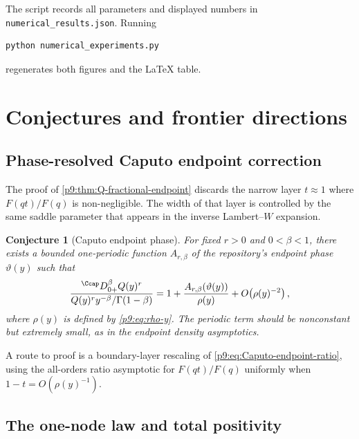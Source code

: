 \documentclass[11pt,oneside]{article}
\newtheorem{conjecture}[theorem]{Conjecture}
\theoremstyle{definition}
\theoremstyle{remark}
\newcommand{\1}{\mathbf 1}
\begin{document}
The script records all parameters and displayed numbers in
\texttt{numerical\_results.json}.  Running
\begin{lstlisting}[style=code,language=bash]
python numerical_experiments.py
\end{lstlisting}
regenerates both figures and the LaTeX table.

\section{Conjectures and frontier directions}
\label{p9:sec:frontiers}

\subsection{Phase-resolved Caputo endpoint correction}

The proof of \cref{p9:thm:Q-fractional-endpoint} discards the narrow layer
$t\approx1$ where $F(qt)/F(q)$ is non-negligible.  The width of that layer is
controlled by the same saddle parameter that appears in the inverse
Lambert--$W$ expansion.

\begin{conjecture}[Caputo endpoint phase]
\label{p9:conj:Caputo-phase}
For fixed $r>0$ and $0<\beta<1$, there exists a bounded one-periodic function
$A_{r,\beta}$ of the repository's endpoint phase $\vartheta(y)$ such that
\begin{equation}
 \frac{{}^{\Ccap}D_{0+}^\beta Q(y)^r}
 {Q(y)^r y^{-\beta}/\Gamma(1-\beta)}
 =1+\frac{A_{r,\beta}(\vartheta(y))}{\rho(y)}
  +O\!\left(\rho(y)^{-2}\right),
 \label{p9:eq:Caputo-phase-conjecture}
\end{equation}
where $\rho(y)$ is defined by \cref{p9:eq:rho-y}.  The periodic term should be
nonconstant but extremely small, as in the endpoint density asymptotics.
\end{conjecture}

A route to proof is a boundary-layer rescaling of
\cref{p9:eq:Caputo-endpoint-ratio}, using the all-orders ratio asymptotic for
$F(qt)/F(q)$ uniformly when $1-t=O(\rho(y)^{-1})$.

\subsection{The one-node law and total positivity}
\end{document}
